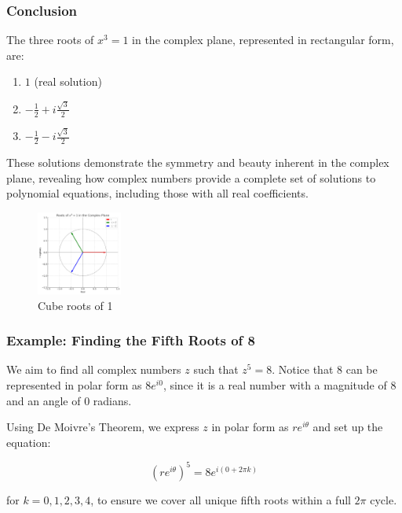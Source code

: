 \documentclass[
]{article}
\providecommand{\tightlist}{%
  \setlength{\itemsep}{0pt}\setlength{\parskip}{0pt}}
\def\tightlist{}
\begin{document}
\subsubsection{Conclusion}\label{conclusion}

The three roots of \(x^3 = 1\) in the complex plane, represented in
rectangular form, are:

\begin{enumerate}
\def\labelenumi{\arabic{enumi}.}
\tightlist
\item
  \(1\) (real solution)
\item
  \(-\frac{1}{2} + i\frac{\sqrt{3}}{2}\)
\item
  \(-\frac{1}{2} - i\frac{\sqrt{3}}{2}\)
\end{enumerate}

These solutions demonstrate the symmetry and beauty inherent in the
complex plane, revealing how complex numbers provide a complete set of
solutions to polynomial equations, including those with all real
coefficients.

\begin{figure}
\centering
\includegraphics[width=0.25\textwidth,height=\textheight]{cube-roots-of-one.png}
\caption{Cube roots of 1}
\end{figure}

\subsubsection{Example: Finding the Fifth Roots of
8}\label{example-finding-the-fifth-roots-of-8}

We aim to find all complex numbers \(z\) such that \(z^5 = 8\). Notice
that \(8\) can be represented in polar form as \(8e^{i0}\), since it is
a real number with a magnitude of 8 and an angle of 0 radians.

Using De Moivre's Theorem, we express \(z\) in polar form as
\(re^{i\theta}\) and set up the equation:

\[
(re^{i\theta})^5 = 8e^{i(0 + 2\pi k)}
\]

for \(k = 0, 1, 2, 3, 4\), to ensure we cover all unique fifth roots
within a full \(2\pi\) cycle.
\end{document}
